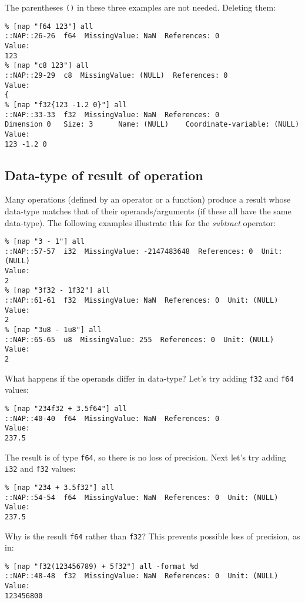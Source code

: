   

The parentheses 
  \texttt{()} in these three examples are not needed. Deleting
  them:
  \begin{verbatim}
% [nap "f64 123"] all
::NAP::26-26  f64  MissingValue: NaN  References: 0
Value:
123
% [nap "c8 123"] all
::NAP::29-29  c8  MissingValue: (NULL)  References: 0
Value:
{
% [nap "f32{123 -1.2 0}"] all
::NAP::33-33  f32  MissingValue: NaN  References: 0
Dimension 0   Size: 3      Name: (NULL)    Coordinate-variable: (NULL)
Value:
123 -1.2 0
\end{verbatim}

\subsection{Data-type of result of operation}
    \label{data-type-result}

Many operations (defined by an operator or a function) produce a
  result whose data-type matches that of their operands/arguments (if
  these all have the same data-type). The following examples illustrate
  this for the 
  \emph{subtract} operator:
  \begin{verbatim}
% [nap "3 - 1"] all
::NAP::57-57  i32  MissingValue: -2147483648  References: 0  Unit: (NULL)
Value:
2
% [nap "3f32 - 1f32"] all
::NAP::61-61  f32  MissingValue: NaN  References: 0  Unit: (NULL)
Value:
2
% [nap "3u8 - 1u8"] all
::NAP::65-65  u8  MissingValue: 255  References: 0  Unit: (NULL)
Value:
2
\end{verbatim}

  

What happens if the operands differ in data-type? Let's try
  adding 
  \texttt{f32} and 
  \texttt{f64} values:
  \begin{verbatim}
% [nap "234f32 + 3.5f64"] all
::NAP::40-40  f64  MissingValue: NaN  References: 0
Value:
237.5
\end{verbatim}

The result is of type 
  \texttt{f64}, so there is no loss of precision. Next let's
  try adding 
  \texttt{i32} and 
  \texttt{f32} values:
  \begin{verbatim}
% [nap "234 + 3.5f32"] all
::NAP::54-54  f64  MissingValue: NaN  References: 0  Unit: (NULL)
Value:
237.5
\end{verbatim}

  

Why is the result 
  \texttt{f64} rather than 
  \texttt{f32}? This prevents possible loss of precision, as
  in:
  \begin{verbatim}
% [nap "f32(123456789) + 5f32"] all -format %d
::NAP::48-48  f32  MissingValue: NaN  References: 0  Unit: (NULL)
Value:
123456800
\end{verbatim}

